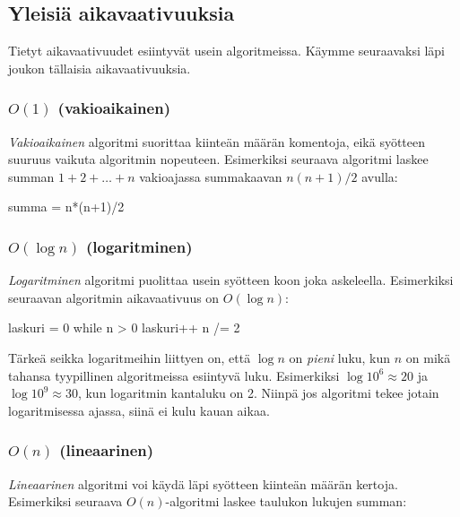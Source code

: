 \subsection{Yleisiä aikavaativuuksia}

Tietyt aikavaativuudet esiintyvät usein algoritmeissa.
Käymme seuraavaksi läpi joukon tällaisia aikavaativuuksia.


\subsubsection{$O(1)$ (vakioaikainen)}

\emph{Vakioaikainen} algoritmi suorittaa kiinteän määrän komentoja,
eikä syötteen suuruus vaikuta algoritmin nopeuteen.
Esimerkiksi seuraava algoritmi laskee summan $1+2+\dots+n$
vakioajassa summakaavan $n(n+1)/2$ avulla:

\begin{code}
summa = n*(n+1)/2
\end{code}


\subsubsection{$O(\log n)$ (logaritminen)}

\emph{Logaritminen} algoritmi puolittaa usein syötteen koon
joka askeleella.
Esimerkiksi seuraavan algoritmin aikavaativuus on $O(\log n)$:

\begin{code}
laskuri = 0
while n > 0
    laskuri++
    n /= 2
\end{code}

Tärkeä seikka logaritmeihin liittyen on, että
$\log n$ on \emph{pieni} luku, kun $n$ on mikä tahansa 
tyypillinen algoritmeissa esiintyvä luku.
Esimerkiksi $\log 10^6 \approx 20$ ja $\log 10^9 \approx 30$,
kun logaritmin kantaluku on 2.
Niinpä jos algoritmi tekee jotain logaritmisessa ajassa,
siinä ei kulu kauan aikaa.


\subsubsection{$O(n)$ (lineaarinen)}

\emph{Lineaarinen} algoritmi voi käydä läpi syötteen kiinteän määrän kertoja.
Esimerkiksi seuraava $O(n)$-algoritmi laskee taulukon lukujen summan:

